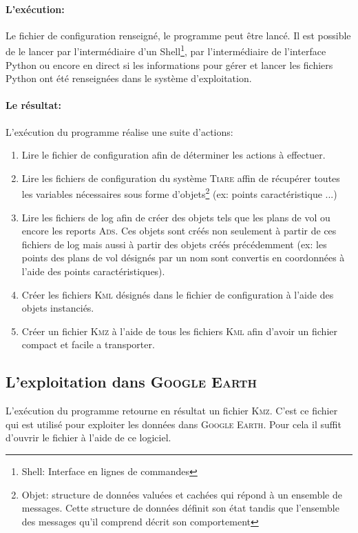             \paragraph{L'exécution:}
Le fichier de configuration renseigné, le programme peut être lancé. Il est possible de le lancer par l'intermédiaire d'un Shell\footnote{Shell: Interface en lignes de commandes}, par l'intermédiaire de l'interface Python ou encore en direct si les informations pour gérer et lancer les fichiers Python ont été renseignées dans le système d'exploitation.
            \paragraph{Le résultat:}
L'exécution du programme réalise une suite d'actions:
\begin{enumerate}
    \item Lire le fichier de configuration afin de déterminer les actions à effectuer.
    \item Lire les fichiers de configuration du système \textsc{Tiare} affin de récupérer toutes les variables nécessaires sous forme d'objets\footnote{Objet: structure de données valuées et cachées qui répond à un ensemble de messages. Cette structure de données définit son état tandis que l'ensemble des messages qu'il comprend décrit son comportement} (ex: points caractéristique ...)
    \item Lire les fichiers de log afin de créer des objets tels que les plans de vol ou encore les reports \textsc{Ads}. Ces objets sont créés non seulement à partir de ces fichiers de log mais aussi à partir des objets créés précédemment (ex: les points des plans de vol désignés par un nom sont convertis en coordonnées à l'aide des points caractéristiques).
    \item Créer les fichiers \textsc{Kml} désignés dans le fichier de configuration à l'aide des objets instanciés.
    \item Créer un fichier \textsc{Kmz} à l'aide de tous les fichiers \textsc{Kml} afin d'avoir un fichier compact et facile a transporter.
\end{enumerate}

    \subsection{L'exploitation dans \textsc{Google Earth}}
L'exécution du programme retourne en résultat un fichier \textsc{Kmz}. C'est ce fichier qui est utilisé pour exploiter les données dans \textsc{Google Earth}. Pour cela il suffit d'ouvrir le fichier à l'aide de ce logiciel.

